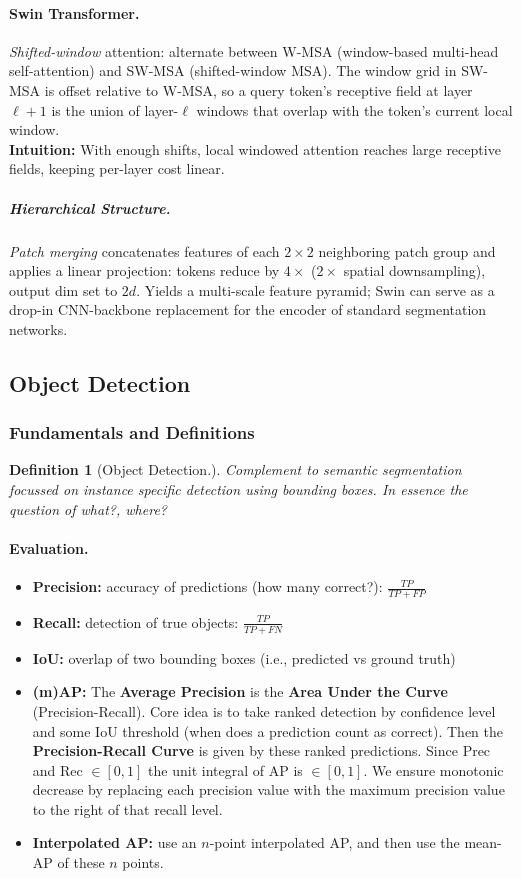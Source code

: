 \documentclass{article}
\newtheorem{definition}{Definition}
\begin{document}
\paragraph{Swin Transformer.}
\textit{Shifted-window} attention: alternate between W-MSA (window-based multi-head self-attention) and SW-MSA (shifted-window MSA). The window grid in SW-MSA is offset relative to W-MSA, so a query token's receptive field at layer $\ell+1$ is the union of layer-$\ell$ windows that overlap with the token's current local window.\\

\textbf{Intuition:} With enough shifts, local windowed attention reaches large receptive fields, keeping per-layer cost linear.

\subparagraph{Hierarchical Structure.}
\textit{Patch merging} concatenates features of each $2\!\times\!2$ neighboring patch group and applies a linear projection: tokens reduce by $4\times$ ($2\times$ spatial downsampling), output dim set to $2d$. Yields a multi-scale feature pyramid; Swin can serve as a drop-in CNN-backbone replacement for the encoder of standard segmentation networks.

\subsection{Object Detection}
\subsubsection{Fundamentals and Definitions}
\begin{definition}[Object Detection.] 
    Complement to semantic segmentation focussed on instance specific detection using bounding boxes. In essence the question of \textit{what?, where?}
\end{definition}

\paragraph{Evaluation.}
\begin{itemize}
    \item \textbf{Precision:} accuracy of predictions (how many correct?): $\frac{TP}{TP + FP}$
    \item \textbf{Recall:} detection of true objects: $\frac{TP}{TP + FN} $ 
    \item \textbf{IoU:} overlap of two bounding boxes (i.e., predicted vs ground truth)
    \item \textbf{(m)AP:} The \textbf{Average Precision} is the \textbf{Area Under the Curve} (Precision-Recall).
    Core idea is to take ranked detection by confidence level and some IoU threshold (when does a prediction count as correct).
    Then the \textbf{Precision-Recall Curve} is given by these ranked predictions. Since Prec and Rec $\in [0,1]$ the unit integral of AP is $\in [0,1]$.
    We ensure monotonic decrease by replacing each precision value with the maximum precision value to the right of that recall level.
    \item \textbf{Interpolated AP:} use an $n$-point interpolated AP, and then use the mean-AP of these $n$ points.
\end{itemize} 
\end{document}
